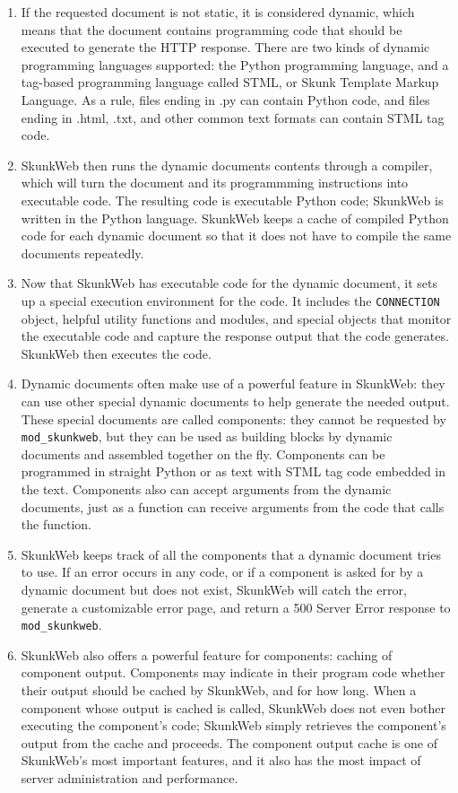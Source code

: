 \documentclass[titlepage]{manual}
\begin{document}
\begin{enumerate}
\item If the requested document is not static, it is considered
dynamic, which means that the document contains programming code
that should be executed to generate the HTTP response. There are two
kinds of dynamic programming languages supported: the Python
programming language, and a tag-based programming language called
STML, or Skunk Template Markup Language. As a rule, files ending in
.py can contain Python code, and files ending in .html, .txt, and
other common text formats can contain STML tag code.

\item SkunkWeb then runs the dynamic documents contents through a
compiler, which will turn the document and its programmming
instructions into executable code. The resulting code is executable
Python code; SkunkWeb is written in the Python language. SkunkWeb
keeps a cache of compiled Python code for each dynamic document so
that it does not have to compile the same documents repeatedly.

\item Now that SkunkWeb has executable code for the dynamic document,
it sets up a special execution environment for the code. It includes
the \texttt{CONNECTION} object, helpful utility functions and modules, and
special objects that monitor the executable code and capture the
response output that the code generates. SkunkWeb then executes the
code.

\item Dynamic documents often make use of a powerful feature in
SkunkWeb: they can use other special dynamic documents to help
generate the needed output. These special documents are called
components: they cannot be requested by \texttt{mod\_skunkweb}, but
they can be used as building blocks by dynamic documents and
assembled together on the fly. Components can be programmed in
straight Python or as text with STML tag code embedded in the
text. Components also can accept arguments from the dynamic
documents, just as a function can receive arguments from the code that
calls the function.

\item SkunkWeb keeps track of all the components that a dynamic
document tries to use. If an error occurs in any code, or if a
component is asked for by a dynamic document but does not exist,
SkunkWeb will catch the error, generate a customizable error page,
and return a 500 Server Error response to \texttt{mod\_skunkweb}.

\item SkunkWeb also offers a powerful feature for components: caching
of component output. Components may indicate in their program code
whether their output should be cached by SkunkWeb, and for how long.
When a component whose output is cached is called, SkunkWeb does not
even bother executing the component's code; SkunkWeb simply retrieves
the component's output from the cache and proceeds. The component
output cache is one of SkunkWeb's most important features, and it also
has the most impact of server administration and performance.


\end{enumerate}
\end{document}
